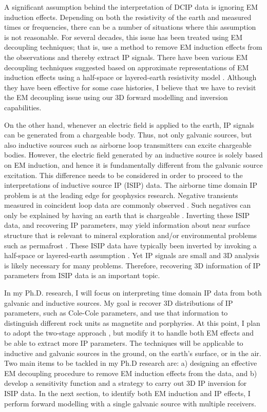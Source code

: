 \documentclass[letterpaper,11pt]{article}
\begin{document}
A significant assumption behind the interpretation of DCIP data is ignoring EM induction effects. Depending on both the resistivity of the earth and measured times or frequencies, there can be a number of situations where this assumption is not reasonable. For several decades, this issue has been treated using EM decoupling techniques; that is, use a  method to remove EM induction effects from the observations and thereby extract IP signals. There have been various EM decoupling techniques suggested based on approximate representations of EM induction effects using a half-space or layered-earth resistivity model \cite[]{Wynn1975,routh2001}. Although they have been effective for some case histories, I believe that we have to revisit the EM decoupling issue using our 3D forward modelling and inversion capabilities.  

On the other hand, whenever an electric field is applied to the earth, IP signals can be generated from a chargeable body. Thus, not only galvanic sources, but also inductive sources such as airborne loop transmitters can excite chargeable bodies. However, the electric field generated by an inductive source is solely based on EM induction, and hence it is fundamentally different from the galvanic source excitation. This difference needs to be considered in order to proceed to the interpretations of inductive source IP (ISIP) data. The airborne time domain IP problem is at the leading edge for geophysics research. Negative transients measured in coincident loop data are commonly observed \cite[]{SmithandKlein,JansenEtAl2004,Kang2015b}. Such negatives can only be explained by having an earth that is chargeable \cite[]{Weidelt1982}. Inverting these ISIP data, and recovering IP parameters, may yield information about near surface structure that is relevant to mineral exploration and/or environmental problems such as permafrost \cite[]{SmithandKlein, Kang2015b}. These ISIP data have typically been inverted by invoking a half-space or layered-earth assumption \cite[]{Kratzer2012}. Yet IP signals are small and 3D analysis is likely necessary for many problems. Therefore, recovering 3D information of IP parameters from ISIP data is an important topic. 

In my Ph.D. research, I will focus on interpreting time domain IP data from both galvanic and inductive sources. My goal is recover  3D distributions of IP parameters, such as Cole-Cole parameters, and use that information to  distinguish different rock units  as magnetite and porphyries. 
At this point, I plan to  adopt the two-stage approach \cite[]{doug1994}, but modify it to handle both EM effects and be able to extract more IP parameters. The techniques will be applicable to inductive and galvanic sources in the ground, on the earth’s surface, or in the air.  Two main items to be tackled in my Ph.D research are:  a) designing an effective EM decoupling procedure to remove EM induction effects from the data, and b) develop a sensitivity function and a strategy to carry out 3D IP inversion for ISIP data. In the next section, to identify both EM induction and IP effects, I perform forward modelling with a single galvanic source with multiple receivers. 
\end{document}
